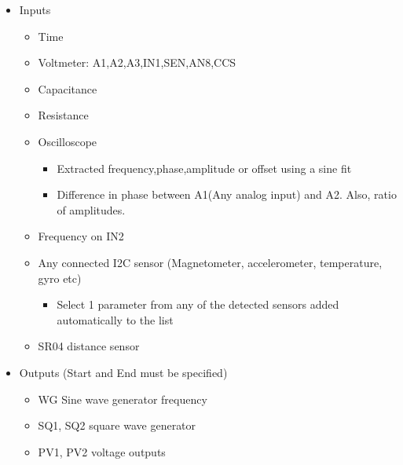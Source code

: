 \documentclass[a4paper,12pt,english]{sphinxmanual}
\begin{document}
\begin{itemize}
\item {} 
Inputs
\begin{itemize}
\item {} 
Time

\item {} 
Voltmeter: A1,A2,A3,IN1,SEN,AN8,CCS

\item {} 
Capacitance

\item {} 
Resistance

\item {} 
Oscilloscope
\begin{itemize}
\item {} 
Extracted frequency,phase,amplitude or offset using a sine fit

\item {} 
Difference in phase between A1(Any analog input) and A2. Also, ratio of amplitudes.

\end{itemize}

\item {} 
Frequency on IN2

\item {} 
Any connected I2C sensor (Magnetometer, accelerometer, temperature, gyro etc)
\begin{itemize}
\item {} 
Select 1 parameter from any of the detected sensors added automatically to the list

\end{itemize}

\item {} 
SR04 distance sensor

\end{itemize}

\item {} 
Outputs (Start and End must be specified)
\begin{itemize}
\item {} 
WG Sine wave generator frequency

\item {} 
SQ1, SQ2 square wave generator

\item {} 
PV1, PV2 voltage outputs

\end{itemize}

\end{itemize}
\end{document}
